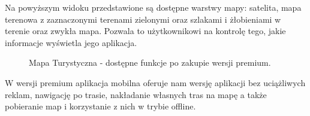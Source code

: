 Na powyższym widoku przedstawione są dostępne warstwy mapy: satelita, mapa terenowa z zaznaczonymi terenami zielonymi oraz szlakami i żłobieniami w terenie oraz zwykła mapa. Pozwala to użytkownikowi na kontrolę tego, jakie informacje wyświetla jego aplikacja. 
\begin{figure}[H]
    \centering
    \caption{Mapa Turystyczna - dostępne funkcje po zakupie wersji premium.}
    \label{mapatu:premium}
\end{figure}
W wersji premium aplikacja mobilna oferuje nam wersję aplikacji bez uciążliwych reklam, nawigację po trasie, nakładanie własnych tras na mapę a także pobieranie map i korzystanie z nich w trybie offline.

